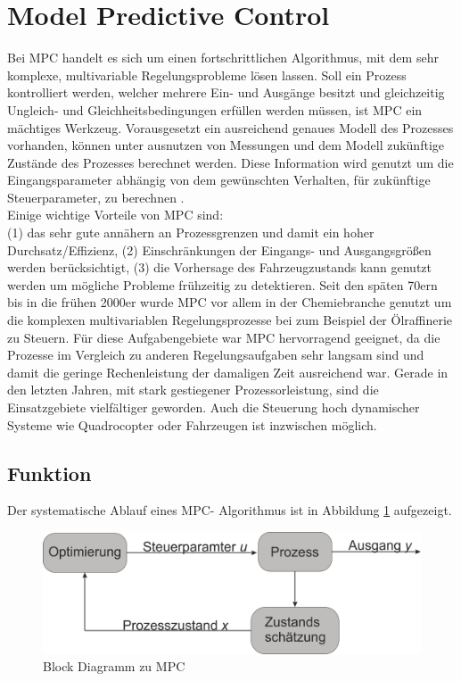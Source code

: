 \documentclass{like}
\begin{document}
\section{Model Predictive Control}
Bei \ac{MPC} handelt es sich um einen fortschrittlichen Algorithmus, mit dem sehr komplexe, multivariable Regelungsprobleme lösen lassen. Soll ein Prozess kontrolliert werden, welcher mehrere Ein- und Ausgänge besitzt und gleichzeitig Ungleich- und Gleichheitsbedingungen erfüllen werden müssen, ist \acs{MPC} ein mächtiges Werkzeug. Vorausgesetzt ein ausreichend genaues Modell des Prozesses vorhanden, können unter ausnutzen von Messungen und dem Modell zukünftige Zustände des Prozesses berechnet werden. Diese Information wird genutzt um die Eingangsparameter abhängig von dem gewünschten Verhalten, für zukünftige Steuerparameter, zu berechnen \cite{seborg2010process}. \\
Einige wichtige Vorteile von \ac{MPC} sind: \\
(1) das sehr gute annähern an Prozessgrenzen und damit ein hoher Durchsatz/Effizienz, (2) Einschränkungen der Eingangs- und Ausgangsgrößen werden berücksichtigt, (3) die Vorhersage des Fahrzeugzustands kann genutzt werden um mögliche Probleme frühzeitig zu detektieren.
Seit den späten 70ern bis in die frühen 2000er wurde \ac{MPC} vor allem in der Chemiebranche genutzt um die komplexen multivariablen Regelungsprozesse bei zum Beispiel der Ölraffinerie zu Steuern. Für diese Aufgabengebiete war \acl{MPC} hervorragend geeignet, da die Prozesse im Vergleich zu anderen Regelungsaufgaben sehr langsam sind und damit die geringe Rechenleistung der damaligen Zeit ausreichend war. 
Gerade in den letzten Jahren, mit stark gestiegener Prozessorleistung, sind die Einsatzgebiete vielfältiger geworden. Auch die Steuerung hoch dynamischer Systeme wie Quadrocopter \cite{quadcopterMpc} oder Fahrzeugen \cite{carMPC} ist inzwischen möglich. 

\subsection{Funktion}
Der systematische Ablauf eines \ac{MPC}- Algorithmus ist in Abbildung \ref{fig:mpcBlock} aufgezeigt.  

  \begin{figure}[ht!]
  	\centering
  	\includegraphics[width=350pt]{Abbildungen/mpcBlockDiagram.png}
  	\caption{Block Diagramm zu MPC}
  	\label{fig:mpcBlock}
  \end{figure}
\end{document}
